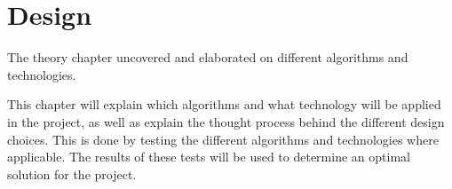\chapter{Design}

The theory chapter uncovered and elaborated on different algorithms and technologies.

This chapter will explain which algorithms and what technology will be applied in the project, as well as explain the thought process behind the different design choices.
This is done by testing the different algorithms and technologies where applicable.
The results of these tests will be used to determine an optimal solution for the project.











